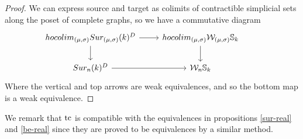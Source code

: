 \begin{proof}
	We can express source and target as colimits of contractible %
	simplicial sets along the poset of complete graphs,
	so we have a commutative diagram
	\begin{equation*}
		\begin{tikzcd}
			hocolim_{(\mu,\sigma)}\sur_{(\mu,\sigma)}(k)^{D} \arrow[r] \arrow[d]& hocolim_{(\mu,\sigma)}\cW_{(\mu,\sigma)}\sym_{k} \arrow[d] \\
			\sur_{n}(k)^{D}\arrow[r] & \cW_{n}\sym_{k}&
		\end{tikzcd}
	\end{equation*}
	Where the vertical and top arrows
	are weak equivalences, and so the bottom map is a weak equivalence.
\end{proof}

We remark that $\operatorname{tc}$ is compatible with the equivalences in propositions \ref{sur-real} and \ref{be-real} since they are proved to be equivalences by a similar method.





